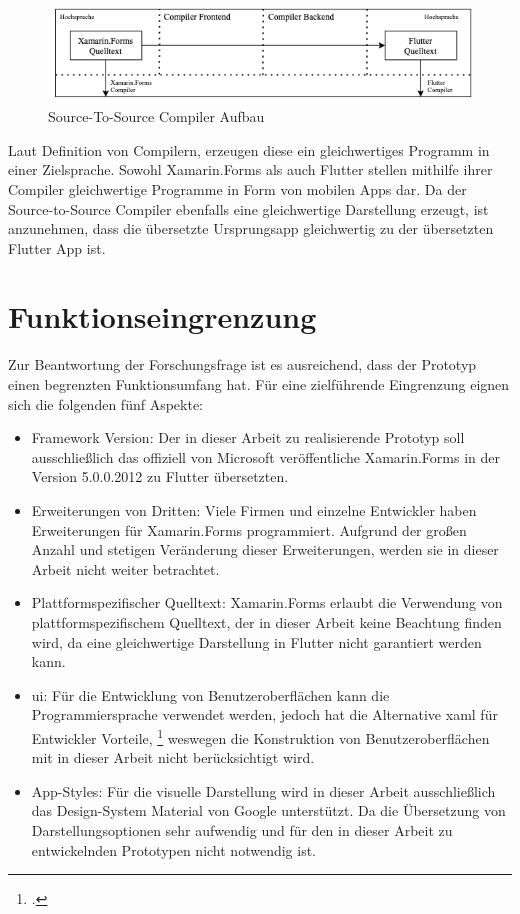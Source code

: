 \begin{figure}[!ht]
 \includegraphics[width=\textwidth,keepaspectratio]{Images/CompilerArchitecture/S2SArchitecture.png}
 \caption{Source-To-Source Compiler Aufbau}
 \label{fig:S2SCompilerAufbau}
\end{figure}

Laut Definition von Compilern, erzeugen diese ein gleichwertiges Programm in einer Zielsprache.  Sowohl Xamarin.Forms als auch Flutter stellen mithilfe ihrer Compiler gleichwertige Programme in Form von mobilen Apps dar.  Da der Source-to-Source Compiler ebenfalls eine gleichwertige Darstellung erzeugt, ist anzunehmen, dass die übersetzte Ursprungsapp gleichwertig zu der übersetzten Flutter App ist. 

\section{Funktionseingrenzung}
Zur Beantwortung der Forschungsfrage ist es ausreichend, dass der Prototyp einen begrenzten Funktionsumfang hat.  Für eine zielführende Eingrenzung eignen sich die folgenden fünf Aspekte:

\begin{itemize}
\setlength\itemsep{-0.6em}
 \item Framework Version: Der in dieser Arbeit zu realisierende Prototyp soll ausschließlich das offiziell von Microsoft veröffentliche Xamarin.Forms in der Version 5.0.0.2012 zu Flutter übersetzten.  
 \item Erweiterungen von Dritten: Viele Firmen und einzelne Entwickler haben Erweiterungen für Xamarin.Forms programmiert.  Aufgrund der großen Anzahl und stetigen Veränderung dieser Erweiterungen, werden sie in dieser Arbeit nicht weiter betrachtet.  
 \item Plattformspezifischer Quelltext: Xamarin.Forms erlaubt die Verwendung von plattformspezifischem Quelltext,  der in dieser Arbeit keine Beachtung finden wird, da eine gleichwertige Darstellung in Flutter nicht garantiert werden kann. 
  \item \ac{ui}: Für die Entwicklung von Benutzeroberflächen kann die Programmiersprache \Csharp{} verwendet werden,  jedoch hat die Alternative \ac{xaml} für Entwickler Vorteile, \footcite[Vgl.][Abgerufen am \today]{MicrosoftXAML2017} weswegen die Konstruktion von Benutzeroberflächen mit \Csharp{} in dieser Arbeit nicht berücksichtigt wird.  
  \item App-Styles: Für die visuelle Darstellung wird in dieser Arbeit ausschließlich das Design-System Material von Google unterstützt.  Da die Übersetzung von Darstellungsoptionen sehr aufwendig  und für den in dieser Arbeit zu entwickelnden Prototypen nicht notwendig ist.  
\end{itemize}

